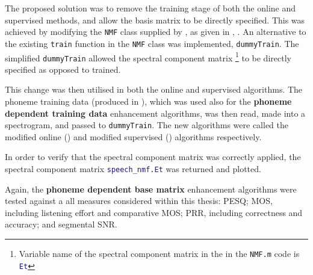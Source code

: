 The proposed solution was to remove the training stage of both the
online and supervised methods, and allow the basis matrix to be directly
specified. This was achieved by modifying the \lstinline[language=bash]!NMF!
class supplied by \citet{mohammadiha2013supervised}, as given in
, \textit{}. An alternative
to the existing \lstinline[language=bash]!train! function in the
\lstinline[language=bash]!NMF! class was implemented, \lstinline[language=bash]!dummyTrain!.
The simplified \lstinline[language=bash]!dummyTrain! allowed the
spectral component matrix%
\footnote{Variable name of the spectral component matrix in the in the \lstinline[language=bash]!NMF.m!
code is \lstinline[language=Matlab]!Et!%
} to be directly specified as opposed to trained.

This change was then utilised in both the online and supervised algorithms.
The phoneme training data (produced in ),
which was used also for the \textbf{phoneme dependent training data}
enhancement algorithms, was then read, made into a spectrogram, and
passed to \lstinline[language=bash]!dummyTrain!. The new algorithms
were called the modified online () and modified
supervised () algorithms respectively.

In order to verify that the spectral component matrix was correctly
applied, the spectral component matrix \lstinline[language=Matlab]!speech_nmf.Et!
was returned and plotted.

Again, the \textbf{phoneme dependent base matrix} enhancement algorithms
were tested against a all measures considered within this thesis:
\ac{PESQ}; \ac{MOS}, including listening effort and comparative
\ac{MOS}; \ac{PRR}, including correctness and accuracy; and segmental
\ac{SNR}.
